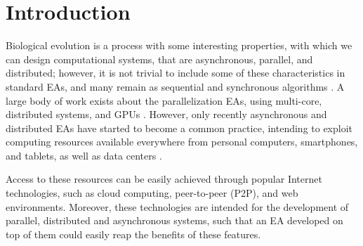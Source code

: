 \documentclass[conference]{IEEEtran}
\begin{document}
\section{Introduction}

Biological evolution is a process with some interesting properties,
with which we can design computational systems, that are asynchronous,
parallel, and distributed;
however, it is not trivial to include some of these characteristics in standard
EAs, and many remain as sequential and synchronous algorithms \cite{eiben}.
A large body of work exists about the parallelization EAs, using multi-core, 
distributed systems, and GPUs \cite{cantu2000efficient,hofmann2013performance}.
However, only recently asynchronous and distributed EAs have started to become
a common practice, intending to exploit computing resources available everywhere
from personal computers, smartphones, and tablets, as well as data 
centers \cite{agajaj,FlexGP}. 

Access to these resources can be easily achieved through popular Internet 
technologies, such as cloud computing, peer-to-peer (P2P), and web environments. 
Moreover, these technologies are intended for the
development of parallel, distributed and asynchronous systems, such
that an EA developed on top of them could easily reap the benefits of
these features.
\end{document}
